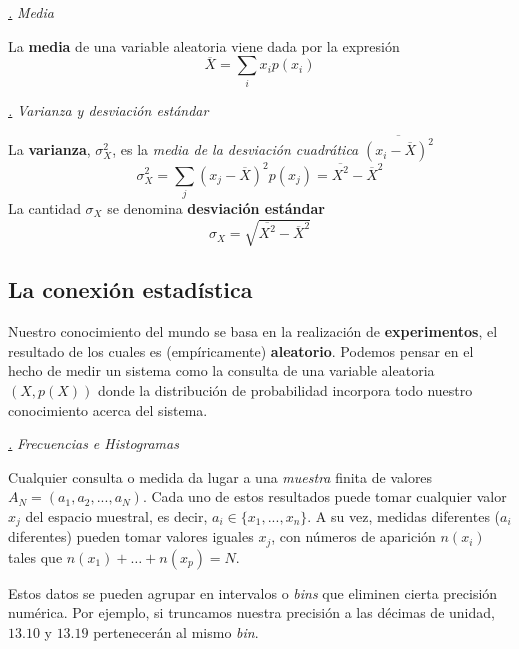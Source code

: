 \documentclass[a4paper,11pt]{book} %
\numberwithin{equation}{chapter}
\def\subsubiContadorIt{\par\addtocounter{subsubsection}{1}\underline{\it\thesubsubsection.}\hskip0.5cm \setcounter{subsubsubsectionIt}{0}}
\newcommand{\SubsubiIt}[1]{
		\subsubiContadorIt \textit{#1}
	}
\newcounter{subsubsubsectionIt}[subsubsection]
\begin{document}
			\SubsubiIt{Media}

	\begin{mybox_gray2}{}
La \textbf{media} de una variable aleatoria  viene dada por la expresión 
	\begin{equation}
	\overline X  = \sum_i x_i p(x_i)
	\end{equation}
	\end{mybox_gray2}	


			\SubsubiIt{Varianza y desviación estándar}
		
	\begin{mybox_gray2}{}
La \textbf{varianza}, $\sigma_X^2$, es la  \textit{media de la desviación cuadrática} $\overline{(x_i - \overline{X} )^2}$ 
	\begin{equation}
	\sigma^2_X = \sum_j (x_j-\overline{X})^2 p(x_j) = \overline{X^2} - \overline{X}^2
	\end{equation}
La cantidad $\sigma_X$ se denomina  \textbf{desviación estándar}
	\begin{equation}
	\sigma_X = \sqrt{\overline{X^2} - \overline{X}^2}
	\end{equation}
	\end{mybox_gray2}			
			





		\subsection{La conexión estadística}

Nuestro conocimiento del mundo se basa en la realización de \textbf{experimentos}, el resultado de los cuales es (empíricamente) \textbf{aleatorio}. Podemos pensar en el hecho de medir un sistema como la consulta de una variable aleatoria $(X,p(X))$ donde la distribución de probabilidad incorpora todo nuestro conocimiento acerca del sistema.

			\SubsubiIt{Frecuencias e Histogramas}

Cualquier consulta o medida da lugar a una \textit{muestra} finita de valores $A_N = (a_1,a_2,...,a_N)$. Cada uno de estos resultados puede tomar cualquier valor $x_j$ del espacio muestral, es decir, $a_i\in \{x_1,...,x_n\}$. A su vez, medidas diferentes ($a_i$ diferentes) pueden tomar valores iguales $x_j$, con números de aparición $n(x_i)$ tales que  $n(x_1) +  \ldots + n(x_p) = N$. 

Estos datos se pueden agrupar en intervalos o \textit{bins} que eliminen cierta precisión numérica. 
Por ejemplo, si truncamos nuestra precisión a las décimas de unidad,  $13.10$ y $13.19$ pertenecerán al mismo \textit{bin}. 
\end{document}
